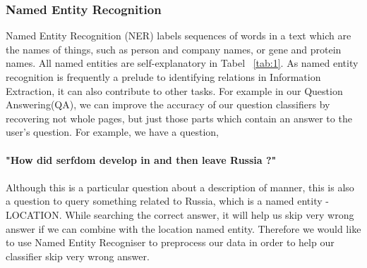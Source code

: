 \documentclass[10pt,twocolumn,letterpaper]{article}
\begin{document}
\subsubsection{Named Entity Recognition}
Named Entity Recognition (NER) \cite{finkel2005incorporating}labels sequences of words in a text which are the names of things, such as person and company names, or gene and protein names. All named entities are self-explanatory in Tabel ~\ref{tab:1}. As named entity recognition is frequently a prelude to identifying relations in Information Extraction, it can also contribute to other tasks. For example in our Question Answering(QA), we can improve the accuracy of our question classifiers by recovering not whole pages, but just those parts which contain an answer to the user's question. For example, we have a question, \\\\{\bf "How did serfdom develop in and then leave Russia ?"} \\\\Although this is a particular question about a description of manner, this is also a question to query something related to Russia, which is a named entity - LOCATION. While searching the correct answer, it will help us skip very wrong answer if we can combine with the location named entity. Therefore we would like to use Named Entity Recogniser to preprocess our data in order to help our classifier skip very wrong answer.
	\begin{table}[!hbt]
		\caption{NER}
		\label{tab:1}
	\end{table}
\end{document}
